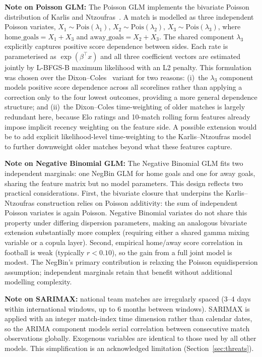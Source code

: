 \documentclass[conference]{IEEEtran}
\begin{document}
\textbf{Note on Poisson GLM:} The Poisson GLM implements the bivariate Poisson
distribution of Karlis and Ntzoufras~\cite{karlis2003analysis}. A match is modelled
as three independent Poisson variates, $X_1 \sim \text{Pois}(\lambda_1)$,
$X_2 \sim \text{Pois}(\lambda_2)$, $X_3 \sim \text{Pois}(\lambda_3)$, where
$\text{home\_goals} = X_1 + X_3$ and $\text{away\_goals} = X_2 + X_3$.
The shared component $\lambda_3$ explicitly captures positive score dependence between
sides. Each rate is parameterised as $\exp(\beta^\top x)$ and all three coefficient
vectors are estimated jointly by L-BFGS-B maximum likelihood with an L2 penalty.
This formulation was chosen over the Dixon--Coles~\cite{dixon1997modelling} variant for
two reasons: (i)~the $\lambda_3$ component models positive score dependence across all
scorelines rather than applying a correction only to the four lowest outcomes, providing
a more general dependence structure; and (ii)~the Dixon--Coles time-weighting of older
matches is largely redundant here, because Elo ratings and 10-match rolling form features
already impose implicit recency weighting on the feature side.
A possible extension would be to add explicit likelihood-level time-weighting to the
Karlis--Ntzoufras model to further downweight older matches beyond what these features
capture.

\textbf{Note on Negative Binomial GLM:} The Negative Binomial GLM fits two independent
marginals: one NegBin GLM for home goals and one for away goals, sharing the feature
matrix but no model parameters. This design reflects two practical considerations.
First, the bivariate closure that underpins the Karlis--Ntzoufras construction relies on
Poisson additivity: the sum of independent Poisson variates is again Poisson. Negative
Binomial variates do not share this property under differing dispersion parameters,
making an analogous bivariate extension substantially more complex (requiring either
a shared gamma mixing variable or a copula layer). Second, empirical home/away score
correlation in football is weak (typically $r < 0.10$), so the gain from a full joint
model is modest. The NegBin's primary contribution is relaxing the Poisson
equidispersion assumption; independent marginals retain that benefit without additional
modelling complexity.

\textbf{Note on SARIMAX:} national team matches are irregularly spaced (3--4 days within
international windows, up to 6 months between windows). SARIMAX is applied with an integer
match-index time dimension rather than calendar dates, so the ARIMA component models
serial correlation between consecutive match observations globally. Exogenous variables
are identical to those used by all other models. This simplification is an acknowledged
limitation (Section~\ref{sec:threats}).
\end{document}
